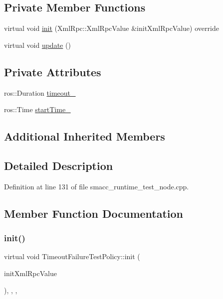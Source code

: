 \subsection*{Private Member Functions}
\begin{DoxyCompactItemize}
\item 
virtual void \hyperlink{classTimeoutFailureTestPolicy_ab37fd803fdd79d989a6fdf58d3473b87}{init} (Xml\+Rpc\+::\+Xml\+Rpc\+Value \&init\+Xml\+Rpc\+Value) override
\item 
virtual void \hyperlink{classTimeoutFailureTestPolicy_a51946c46616697b0b0d9d7c7aaef9f22}{update} ()
\end{DoxyCompactItemize}
\subsection*{Private Attributes}
\begin{DoxyCompactItemize}
\item 
ros\+::\+Duration \hyperlink{classTimeoutFailureTestPolicy_a6075c28b35a0e10632a2f461d7f7b63a}{timeout\+\_\+}
\item 
ros\+::\+Time \hyperlink{classTimeoutFailureTestPolicy_a75bf7a1990099ecd02017c06f3694e64}{start\+Time\+\_\+}
\end{DoxyCompactItemize}
\subsection*{Additional Inherited Members}


\subsection{Detailed Description}


Definition at line 131 of file smacc\+\_\+runtime\+\_\+test\+\_\+node.\+cpp.



\subsection{Member Function Documentation}
\mbox{\label{classTimeoutFailureTestPolicy_ab37fd803fdd79d989a6fdf58d3473b87}} 
\subsubsection{\texorpdfstring{init()}{init()}}
{\footnotesize\ttfamily virtual void Timeout\+Failure\+Test\+Policy\+::init (\begin{DoxyParamCaption}\item[{Xml\+Rpc\+::\+Xml\+Rpc\+Value \&}]{init\+Xml\+Rpc\+Value }\end{DoxyParamCaption})\hspace{0.3cm}{\ttfamily [inline]}, {\ttfamily [override]}, {\ttfamily [private]}, {\ttfamily [virtual]}}



